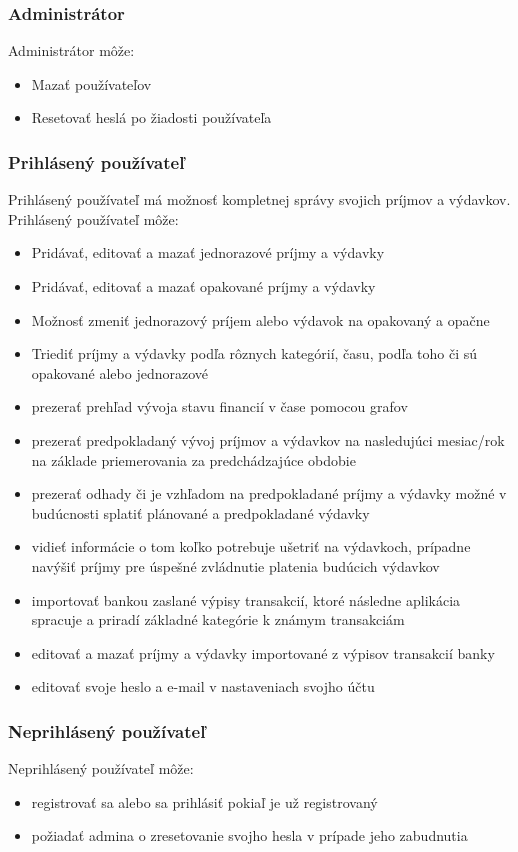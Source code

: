 \documentclass[12pt]{book}
\begin{document}
\subsubsection{Administrátor}
Administrátor môže:
\begin{itemize}
\item{Mazať používateľov}
\item{Resetovať heslá po žiadosti používateľa}
\end{itemize}

\subsubsection{Prihlásený používateľ}
Prihlásený používateľ má možnosť kompletnej správy svojich príjmov a výdavkov.
Prihlásený používateľ môže:
\begin{itemize}
\item{Pridávať, editovať a mazať jednorazové príjmy a výdavky}
\item{Pridávať, editovať a mazať opakované príjmy a výdavky}
\item{Možnosť zmeniť jednorazový príjem alebo výdavok na opakovaný a opačne}
\item{Triediť príjmy a výdavky podľa rôznych kategórií, času, podľa toho či sú opakované alebo jednorazové}
\item{prezerať prehľad vývoja stavu financií v čase pomocou grafov}
\item{prezerať  predpokladaný vývoj príjmov a výdavkov na nasledujúci mesiac/rok na základe priemerovania za predchádzajúce obdobie}
\item{prezerať odhady či je vzhľadom na predpokladané príjmy a výdavky možné v budúcnosti splatiť plánované a predpokladané výdavky}
\item{vidieť informácie o tom koľko potrebuje ušetriť na výdavkoch, prípadne navýšiť príjmy pre úspešné zvládnutie platenia budúcich výdavkov}
\item{importovať bankou zaslané výpisy transakcií, ktoré následne aplikácia spracuje a priradí základné kategórie k známym transakciám}
\item{editovať a mazať príjmy a výdavky importované z výpisov transakcií banky}
\item{editovať svoje heslo a e-mail v nastaveniach svojho účtu}
\end{itemize}

\subsubsection{Neprihlásený používateľ}
Neprihlásený používateľ môže:
\begin{itemize}
\item{registrovať sa alebo sa prihlásiť pokiaľ je už registrovaný}
\item{požiadať admina o zresetovanie svojho hesla v prípade jeho zabudnutia}
\end{itemize}
\end{document}
